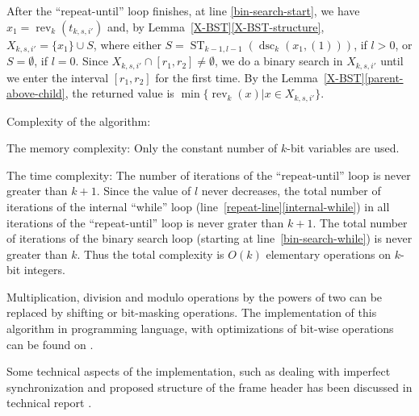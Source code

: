 \documentclass{article}
\newcommand{\tmop}[1]{\ensuremath{\operatorname{#1}}}
\begin{document}
After the ``repeat-until'' loop finishes, at line \ref{bin-search-start}, we
have $x_1 = \tmop{rev}_k (t_{k, s, i'})$ and, by
Lemma~\ref{X-BST}\ref{X-BST-structure}, $X_{k, s, i'} =\{x_1 \} \cup S$,
where either $S = \tmop{ST}_{k - 1, l - 1} (\tmop{dsc}_k (x_1, (1)))$, if $l >
0$, or $S = \emptyset$, if $l = 0$. Since $X_{k, s, i'} \cap [r_1, r_2]
\not= \emptyset$, we do a binary search in $X_{k, s, i'}$ until we enter the
interval $[r_1, r_2]$ for the first time. By the
Lemma~\ref{X-BST}\ref{parent-above-child}, the returned value is $\min
\{\tmop{rev}_k (x) | x \in X_{k, s, i'} \}$.

Complexity of the algorithm:

The memory complexity: Only the constant number of $k$-bit variables are used.

The time complexity: The number of iterations of the ``repeat-until'' loop is
never greater than $k + 1$. Since the value of $l$ never decreases, the total
number of iterations of the internal ``while'' loop
(line~\ref{repeat-line}\ref{internal-while}) in all iterations of the
``repeat-until'' loop is never grater than $k + 1$. The total number of
iterations of the binary search loop (starting at line~\ref{bin-search-while})
is never greater than $k$. Thus the total complexity is $O (k)$ elementary
operations on $k$-bit integers.

Multiplication, division and modulo operations by the powers of two can be
replaced by shifting or bit-masking operations. The implementation of this
algorithm in programming language, with optimizations of bit-wise operations
can be found on {\cite{RBO-WWW}}.

Some technical aspects of the implementation, such as dealing with imperfect
synchronization and proposed structure of the frame header has been discussed
in technical report {\cite{DBLP:journals/corr/abs-1108-5095}}.
\end{document}
